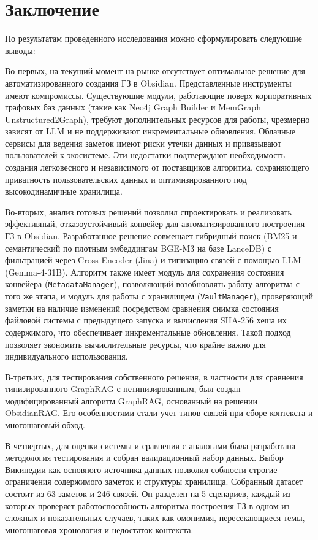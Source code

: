\clearpage
\section{Заключение}

По результатам проведенного исследования
можно сформулировать следующие выводы:

Во-первых, на текущий момент на рынке отсутствует
оптимальное решение для автоматизированного создания
ГЗ в Obsidian.
Представленные инструменты имеют компромиссы.
Существующие модули, работающие поверх корпоративных графовых баз данных
(такие как Neo4j Graph Builder и MemGraph Unstructured2Graph),
требуют дополнительных ресурсов для работы,
чрезмерно зависят от LLM и не поддерживают инкрементальные обновления.
Облачные сервисы для ведения заметок имеют риски утечки данных
и привязывают пользователей к экосистеме.
Эти недостатки подтверждают необходимость создания
легковесного и независимого от поставщиков алгоритма,
сохраняющего приватность пользовательских данных
и оптимизированного под высокодинамичные хранилища.

Во-вторых, анализ готовых решений позволил
спроектировать и реализовать
эффективный, отказоустойчивый конвейер
для автоматизированного построения ГЗ в Obsidian.
Разработанное решение совмещает гибридный поиск
(BM25 и семантический по плотным эмбеддингам BGE-M3 на базе LanceDB)
с фильтрацией через Cross Encoder (Jina)
и типизацию связей с помощью LLM (Gemma-4-31B).
Алгоритм также имеет модуль для сохранения состояния конвейера
(\texttt{MetadataManager}),
позволяющий возобновлять работу алгоритма
с того же этапа,
и модуль для работы с хранилищем (\texttt{VaultManager}),
проверяющий заметки на наличие изменений
посредством сравнения снимка состояния файловой системы
с предыдущего запуска и вычисления SHA-256 хеша их содержимого,
что обеспечивает инкрементальные обновления.
Такой подход позволяет
экономить вычислительные ресурсы,
что крайне важно для индивидуального использования.

В-третьих, для тестирования собственного решения,
в частности для сравнения типизированного GraphRAG с нетипизированным,
был создан модифицированный алгоритм GraphRAG,
основанный на решении ObsidianRAG.
Его особенностями стали учет типов связей при сборе контекста и
многошаговый обход.

В-четвертых, для оценки системы и сравнения с аналогами
была разработана методология тестирования и
собран валидационный набор данных.
Выбор Википедии как основного источника данных
позволил соблюсти строгие ограничения
содержимого заметок и структуры хранилища.
Собранный датасет состоит из 63 заметок и 246 связей.
Он разделен на 5 сценариев, каждый из которых
проверяет работоспособность алгоритма построения ГЗ
в одном из сложных и показательных случаев,
таких как омонимия, пересекающиеся темы, многошаговая хронология и
недостаток контекста.

